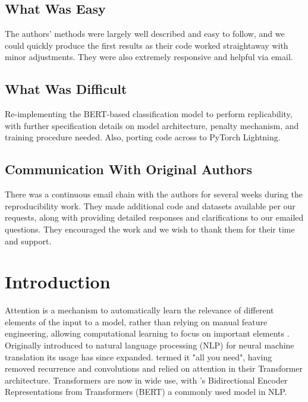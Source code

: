 \subsection*{What Was Easy}
The authors' methods were largely well described and easy to follow, and we could quickly produce the first results as their code worked straightaway with minor adjustments. They were also extremely responsive and helpful via email.

\subsection*{What Was Difficult}
Re-implementing the BERT-based classification model to perform replicability, with further specification details on model architecture, penalty mechanism, and training procedure needed. Also, porting code across to PyTorch Lightning.

\subsection*{Communication With Original Authors}
There was a continuous email chain with the authors for several weeks during the reproducibility work. They made additional code and datasets available per our requests, along with providing detailed responses and clarifications to our emailed questions. They encouraged the work and we wish to thank them for their time and support.


\section{Introduction}
Attention is a mechanism to automatically learn the relevance of different elements of the input to a model, rather than relying on manual feature engineering, allowing computational learning to focus on important elements \citep{galassi2020attention}.
Originally introduced to natural language processing (NLP) for neural machine translation \citep{bahdanau2014neural} its usage has since expanded. \citet{vaswani2017attention} termed it "all you need", having removed recurrence and convolutions and relied on attention in their Transformer architecture. Transformers are now in wide use, with \citet{devlin2018bert}'s Bidirectional Encoder Representations from Transformers (BERT) a commonly used model in NLP.

